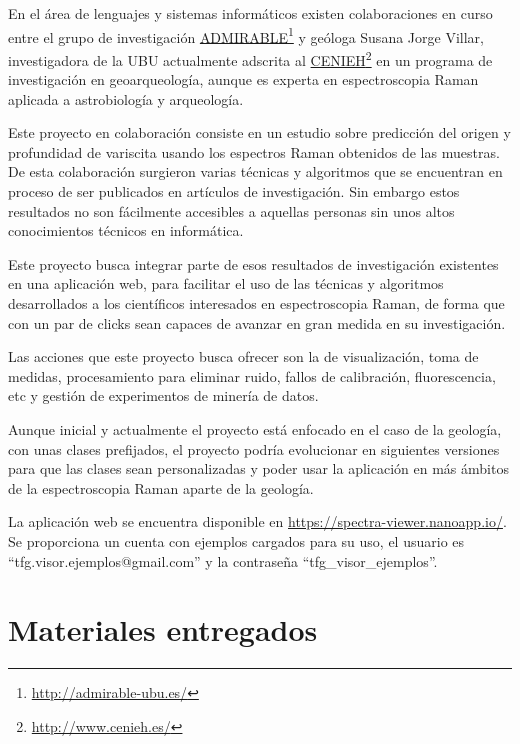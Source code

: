 En el área de lenguajes y sistemas informáticos existen colaboraciones en curso
entre el grupo de investigación
\href{http://admirable-ubu.es/}{ADMIRABLE}\footnote{\url{http://admirable-ubu.es/}}
y geóloga Susana Jorge Villar, investigadora de la UBU actualmente adscrita al
\href{http://www.cenieh.es/}{CENIEH}\footnote{\url{http://www.cenieh.es/}} en un
programa de investigación en geoarqueología\cite{susana-cenieh}, aunque es
experta en espectroscopia Raman aplicada a astrobiología y
arqueología\cite{susana-ubu}.

Este proyecto en colaboración consiste en un estudio sobre predicción del origen
y profundidad de variscita usando los espectros Raman obtenidos de las muestras.
De esta colaboración surgieron varias técnicas y algoritmos que se encuentran en
proceso de ser publicados en artículos de investigación. Sin embargo estos
resultados no son fácilmente accesibles a aquellas personas sin unos altos
conocimientos técnicos en informática.

Este proyecto busca integrar parte de esos resultados de investigación
existentes en una aplicación web, para facilitar el uso de las técnicas y
algoritmos desarrollados a los científicos interesados en espectroscopia Raman,
de forma que con un par de clicks sean capaces de avanzar en gran medida en su
investigación.

Las acciones que este proyecto busca ofrecer son la de visualización, toma de
medidas, procesamiento para eliminar ruido, fallos de calibración,
fluorescencia, etc y gestión de experimentos de minería de datos.

Aunque inicial y actualmente el proyecto está enfocado en el caso de la
geología, con unas clases prefijados, el proyecto podría evolucionar en
siguientes versiones para que las clases sean personalizadas y poder usar la
aplicación en más ámbitos de la espectroscopia Raman aparte de la geología.

La aplicación web se encuentra disponible en
\url{https://spectra-viewer.nanoapp.io/}. Se proporciona un cuenta con ejemplos
cargados para su uso, el usuario es ``tfg.visor.ejemplos@gmail.com'' y la
contraseña ``tfg\_visor\_ejemplos''.

\section{Materiales entregados}

